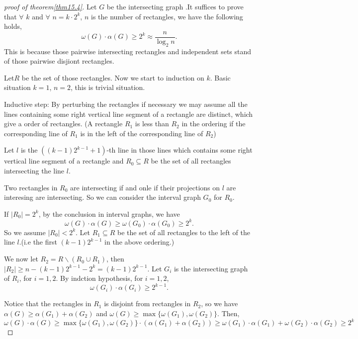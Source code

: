 \documentclass{article}
\theoremstyle{definition}
\begin{document}
 \begin{proof}[proof of theorem\ref{thm15.4}]
   Let $G$ be the intersecting graph .It suffices to prove that $\forall$ $k$ and $\forall$ $n= k\cdot 2^k$, $n$ is the number of rectangles, we have the following holds,
\begin{equation*}
    \omega(G)\cdot\alpha(G)\geq 2^k \approx \frac{n}{\log_2 n}.
\end{equation*}
This is because those pairwise intersecting rectangles and independent sets stand of those pairwise disjiont rectangles.

Let$R$ be the set of those rectangles. Now we start to induction on $k$. Basic situation $k=1$,  $n=2$, this is trivial situation.

Inductive step: By perturbing the rectangles if necessary we may assume all the lines containing some right vertical line segment of a rectangle are distinct, which give a order of rectangles. (A rectangle $R_1$ is less than $R_2$  in the ordering if the corresponding line of $R_1$ is in the left of the corresponding line of $R_2$)

Let $l$ is the  $((k-1)2^{k-1}+1)$-th  line  in those lines which contains some right vertical line segment of a rectangle and $R_0\subseteq R$ be the set of all rectangles intersecting the line $l$. 

Two rectangles in $R_0$ are intersecting if and onle if  their projections on $l$ are interesing are intersecting. So we can consider the interval graph $G_0$ for $R_0$.

If $|R_0| = 2^k$, by the conclusion in interval graphs, we have 
\begin{equation*}
     \omega(G)\cdot\alpha(G)\geq \omega(G_0)\cdot\alpha(G_0)   \geq 2^k.
\end{equation*}
So we assume $|R_0|<  2^k$. Let $R_1\subseteq R$ be the set of all rectangles to the left of the line $l$.(i.e  the first $(k-1)2^{k-1}$ in the above ordering.)

We now let $R_2=R\backslash (R_0\cup R_1)$, then $|R_2|\geq n-(k-1)2^{k-1}-2^k=(k-1)2^{k-1}$. Let $G_i$ is the intersecting graph of $R_i$, for $i=1,2$. By indction hypothesis, for $i=1,2$,
\begin{equation*}
    \omega(G_i)\cdot\alpha(G_i)   \geq 2^{k-1}.
\end{equation*}

Notice that the rectangles in $R_1$ is disjoint from rectangles in $R_2$, so we have $\alpha(G)\geq \alpha(G_1)+\alpha(G_2)$ and $\omega(G)\geq \max\{\omega(G_1),\omega(G_2)\}$. Then,
\begin{equation*}
    \omega(G)\cdot\alpha(G) \geq \max\{\omega(G_1),\omega(G_2)\}\cdot( \alpha(G_1)+\alpha(G_2))\geq \omega(G_1)\cdot\alpha(G_1)+\omega(G_2)\cdot\alpha(G_2)\geq 2^k
\end{equation*}
 \end{proof}
\end{document}
